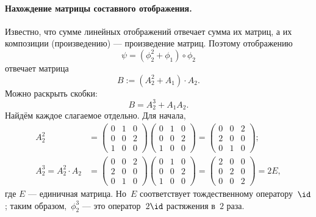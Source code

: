 \begin{proofm}
	\paragraph{Нахождение матрицы составного отображения.}
	Известно, что сумме линейных отображений отвечает сумма их матриц, а их композиции (произведению) --- произведение матриц. Поэтому отображению
	\[
		\psi = (\phi_2^2 + \phi_1) \circ \phi_2
	\]
	отвечает матрица
	\[
		B := (A_2^2 + A_1) \cdot A_2
		.
	\]
	Можно раскрыть скобки:
	\[
		B = A_2^3 + A_1 A_2
		.
	\]
	Найдём каждое слагаемое отдельно. Для начала,
	\begin{align*}
		A_2^2 &=
		\left(
			\begin{array}{ccc}
				0 & 1 & 0
				\\
				\hline
				0 & 0 & 2
				\\
				\hline
				1 & 0 & 0
			\end{array}
		\right)
		\left(
		\begin{array}{c|c|c}
			0 & 1 & 0
			\\
			0 & 0 & 2
			\\
			1 & 0 & 0
		\end{array}
		\right)
		=
		\begin{pmatrix}
			0 & 0 & 2
			\\
			2 & 0 & 0
			\\
			0 & 1 & 0
		\end{pmatrix}
		;
		\\
		A_2^3 = A_2^2 \cdot A_2 &=
		\left(
			\begin{array}{ccc}
				0 & 0 & 2
				\\
				\hline
				2 & 0 & 0
				\\
				\hline
				0 & 1 & 0
			\end{array}
		\right)
		\left(
			\begin{array}{c|c|c}
				0 & 1 & 0
				\\
				0 & 0 & 2
				\\
				1 & 0 & 0
			\end{array}
		\right)
		=
		\begin{pmatrix}
			2 & 0 & 0
			\\
			0 & 2 & 0
			\\
			0 & 0 & 2
		\end{pmatrix}
		=
		2E
		,
	\end{align*}
	где $E$ --- единичная матрица. Но~$E$ соответствует тождественному оператору~$\id$; таким образом,~$\phi_2^3$ --- это оператор~$2\id$ растяжения в~$2$ раза.


\end{proofm}
